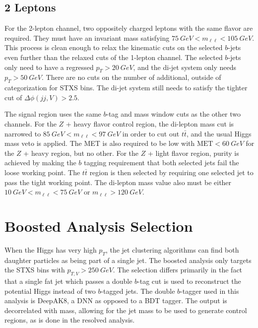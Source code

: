 \subsection{2 Leptons} \label{sec:resolved-2}

For the 2-lepton channel, two oppositely charged leptons with the same flavor are required.
They must have an invariant mass satisfying $\SI{75}{GeV} < m_{\ell\ell} < \SI{105}{GeV}$.
This process is clean enough to relax the kinematic cuts on the selected $b$-jets
even further than the relaxed cuts of the 1-lepton channel.
The selected $b$-jets only need to have a regressed $p_T > \SI{20}{GeV}$,
and the di-jet system only needs $p_T > \SI{50}{GeV}$.
There are no cuts on the number of additional, outside of categorization for STXS bins.
The di-jet system still needs to satisfy the tighter cut of $\Delta\phi(jj,V) > 2.5$.

The signal region uses the same $b$-tag and mass window cuts as the other two channels.
For the $Z$ + heavy flavor control region,
the di-lepton mass cut is narrowed to $\SI{85}{GeV} < m_{\ell\ell} < \SI{97}{GeV}$
in order to cut out $t\bar{t}$, and the usual Higgs mass veto is applied.
The MET is also required to be low with $\mathrm{MET} < \SI{60}{GeV}$
for the $Z$ + heavy region, but no other.
For the $Z$ + light flavor region, purity is achieved by making the $b$ tagging requirement
that both selected jets fail the loose working point.
The $t\bar{t}$ region is then selected by requiring
one selected jet to pass the tight working point.
The di-lepton mass value also must be either $\SI{10}{GeV} < m_{\ell\ell} < \SI{75}{GeV}$
or $m_{\ell\ell} > \SI{120}{GeV}$.

\section{Boosted Analysis Selection}

When the Higgs has very high $p_T$,
the jet clustering algorithms can find both daughter particles
as being part of a single jet.
The boosted analysis only targets the STXS bins with $p_{T,V} > \SI{250}{GeV}$.
The selection differs primarily in the fact that a single fat jet
which passes a double $b$-tag cut \cite{Sirunyan_2018}
is used to reconstruct the potential Higgs instead of two $b$-tagged jets.
The double $b$-tagger used in this analysis is DeepAK8,
a DNN as opposed to a BDT tagger.
The output is decorrelated with mass, allowing for the jet mass to be used
to generate control regions, as is done in the resolved analysis.


